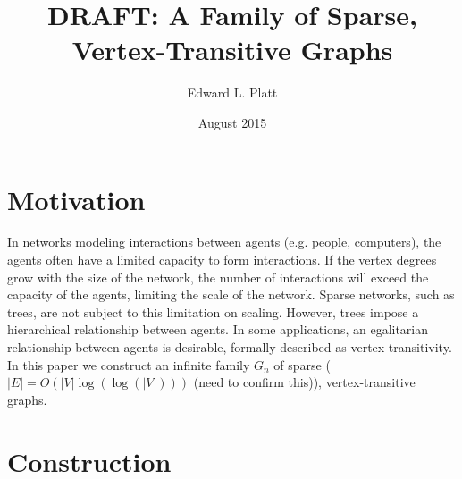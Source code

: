 \documentclass{article}
\title{DRAFT: A Family of Sparse, Vertex-Transitive Graphs}
\author{Edward L. Platt}
\date{August 2015}
\begin{document}
\maketitle

\section{Motivation}
In networks modeling interactions between agents (e.g. people, computers),
the agents often have a limited capacity to form interactions.
If the vertex degrees grow with the size of the network,
the number of interactions will exceed the capacity of the agents,
limiting the scale of the network.
Sparse networks, such as trees, are not subject to this limitation on scaling.
However, trees impose a hierarchical relationship between agents.
In some applications, an egalitarian relationship between agents is desirable,
formally described as vertex transitivity.
In this paper we construct an infinite family $G_n$
of sparse ($|E| = O(|V|\log(\log(|V|)))$
(need to confirm this)), vertex-transitive graphs.

\section{Construction}
\end{document}
